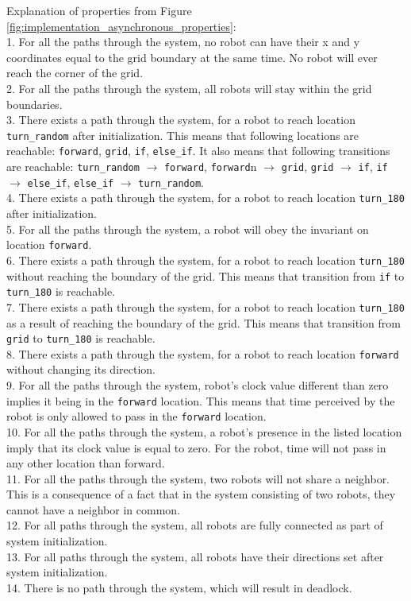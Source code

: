 \noindent
Explanation of properties from Figure \ref{fig:implementation_asynchronous_properties}:\\
1. For all the paths through the system, no robot can have their x and y coordinates equal to the grid boundary at the same time. No robot will ever reach the corner of the grid.\\
2. For all the paths through the system, all robots will stay within the grid boundaries.\\
3. There exists a path through the system, for a robot to reach location \texttt{turn\_random} after initialization. This means that following locations are reachable: \texttt{forward}, \texttt{grid}, \texttt{if}, \texttt{else\_if}. It also means that following transitions are reachable: \texttt{turn\_random} $\rightarrow$ \texttt{forward}, \texttt{forward}n $\rightarrow$ \texttt{grid}, \texttt{grid} $\rightarrow$ \texttt{if}, \texttt{if} $\rightarrow$ \texttt{else\_if}, \texttt{else\_if} $\rightarrow$ \texttt{turn\_random}.\\ 
4. There exists a path through the system, for a robot to reach location \texttt{turn\_180} after initialization.\\
5. For all the paths through the system, a robot will obey the invariant on location \texttt{forward}.\\
6. There exists a path through the system, for a robot to reach location \texttt{turn\_180} without reaching the boundary of the grid. This means that transition from \texttt{if} to \texttt{turn\_180} is reachable.\\
7. There exists a path through the system, for a robot to reach location \texttt{turn\_180} as a result of reaching the boundary of the grid. This means that transition from \texttt{grid} to \texttt{turn\_180} is reachable.\\
8. There exists a path through the system, for a robot to reach location \texttt{forward} without changing its direction. \\
9. For all the paths through the system, robot's clock value different than zero implies it being in the \texttt{forward} location. This means that time perceived by the robot is only allowed to pass in the \texttt{forward} location.\\
10. For all the paths through the system, a robot's presence in the listed location imply that its clock value is equal to zero. For the robot, time will not pass in any other location than forward.\\
11. For all the paths through the system, two robots will not share a neighbor. This is a consequence of a fact that in the system consisting of two robots, they cannot have a neighbor in common.\\
12. For all paths through the system, all robots are fully connected as part of system initialization.\\
13. For all paths through the system, all robots have their directions set after system initialization.\\
14. There is no path through the system, which will result in deadlock.\\



